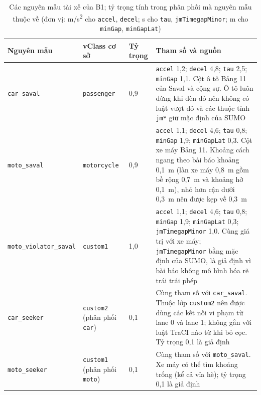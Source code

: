 \documentclass[../DoAn.tex]{subfiles}
\begin{document}
\begin{table}[H]
\centering
\small\setlength{\tabcolsep}{3pt}
\begin{tabular}{|p{3.2cm}|p{2.2cm}|p{1.4cm}|p{6.2cm}|}
\hline
\textbf{Nguyên mẫu} & \textbf{vClass cơ sở} & \textbf{Tỷ trọng} & \textbf{Tham số và nguồn} \\ \hline
\texttt{car\_\allowbreak saval} & \texttt{passenger} & 0,9 & \texttt{accel} 1,2; \texttt{decel} 4,8; \texttt{tau} 2,5; \texttt{minGap} 1,1. Cột ô tô Bảng 11 của Saval và cộng sự. Ô tô luôn dừng khi đèn đỏ nên không có luật vượt đỏ và các thuộc tính \texttt{jm*} giữ mặc định của SUMO \\ \hline
\texttt{moto\_\allowbreak saval} & \texttt{motorcycle} & 0,9 & \texttt{accel} 1,1; \texttt{decel} 4,6; \texttt{tau} 0,8; \texttt{minGap} 1,9; \texttt{minGapLat} 0,3. Cột xe máy Bảng 11. Khoảng cách ngang theo bài báo khoảng 0,1~m (làn xe máy 0,8~m gồm bề rộng 0,7~m và khoảng hở 0,1~m), nhỏ hơn cận dưới 0,3~m nên được kẹp về 0,3~m \\ \hline
\texttt{moto\_\allowbreak violator\_\allowbreak saval} & \texttt{custom1} & 1,0 & \texttt{accel} 1,1; \texttt{decel} 4,6; \texttt{tau} 0,8; \texttt{minGap} 1,9; \texttt{minGapLat} 0,3; \texttt{jmTimegapMinor} 1,0. Cùng giá trị với xe máy; \texttt{jmTimegapMinor} bằng mặc định của SUMO, là giả định vì bài báo không mô hình hóa rẽ trái trái phép \\ \hline
\texttt{car\_\allowbreak seeker} & \texttt{custom2} (phân phối \texttt{car}) & 0,1 & Cùng tham số với \texttt{car\_saval}. Thuộc lớp \texttt{custom2} nên được dùng các kết nối vi phạm từ lane 0 và lane 1; không gắn với luật TraCI nào từ khi bỏ cọc. Tỷ trọng 0,1 là giả định \\ \hline
\texttt{moto\_\allowbreak seeker} & \texttt{custom1} (phân phối \texttt{moto}) & 0,1 & Cùng tham số với \texttt{moto\_saval}. Xe máy có thể tìm khoảng trống (kể cả vỉa hè); tỷ trọng 0,1 là giả định \\ \hline
\end{tabular}
\caption{Các nguyên mẫu tài xế của B1; tỷ trọng tính trong phân phối mà nguyên mẫu thuộc về (đơn vị: m/s\textsuperscript{2} cho \texttt{accel}, \texttt{decel}; s cho \texttt{tau}, \texttt{jmTimegapMinor}; m cho \texttt{minGap}, \texttt{minGapLat})}
\label{table:appendix_b1_archetypes}
\end{table}
\end{document}
